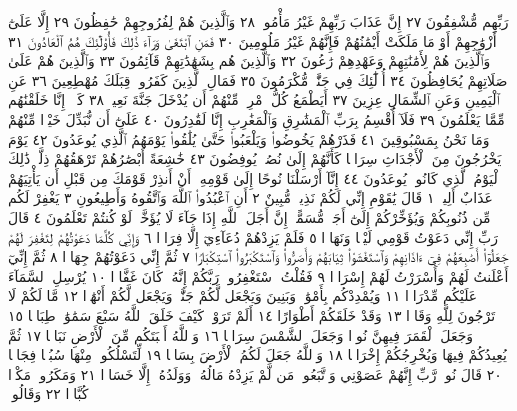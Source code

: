رَبِّهِم مُّشْفِقُونَ ٢٧ إِنَّ عَذَابَ رَبِّهِمْ غَيْرُ مَأْمُونࣲ ٢٨ وَٱلَّذِينَ هُمْ
لِفُرُوجِهِمْ حَٰفِظُونَ ٢٩ إِلَّا عَلَىٰٓ أَزْوَٰجِهِمْ أَوْ مَا مَلَكَتْ أَيْمَٰنُهُمْ فَإِنَّهُمْ
غَيْرُ مَلُومِينَ ٣٠ فَمَنِ ٱبْتَغَىٰ وَرَآءَ ذَٰلِكَ فَأُو۟لَٰٓئِكَ هُمُ ٱلْعَادُونَ ٣١ وَٱلَّذِينَ
هُمْ لِأَمَٰنَٰتِهِمْ وَعَهْدِهِمْ رَٰعُونَ ٣٢ وَٱلَّذِينَ هُم بِشَهَٰدَٰتِهِمْ قَآئِمُونَ ٣٣
وَٱلَّذِينَ هُمْ عَلَىٰ صَلَاتِهِمْ يُحَافِظُونَ ٣٤ أُو۟لَٰٓئِكَ فِي جَنَّٰتࣲ مُّكْرَمُونَ ٣٥
فَمَالِ ٱلَّذِينَ كَفَرُوا۟ قِبَلَكَ مُهْطِعِينَ ٣٦ عَنِ ٱلْيَمِينِ وَعَنِ ٱلشِّمَالِ
عِزِينَ ٣٧ أَيَطْمَعُ كُلُّ ٱمْرِئࣲ مِّنْهُمْ أَن يُدْخَلَ جَنَّةَ نَعِيمࣲ ٣٨ كَلَّآۖ إِنَّا خَلَقْنَٰهُم
مِّمَّا يَعْلَمُونَ ٣٩ فَلَآ أُقْسِمُ بِرَبِّ ٱلْمَشَٰرِقِ وَٱلْمَغَٰرِبِ إِنَّا لَقَٰدِرُونَ ٤٠
عَلَىٰٓ أَن نُّبَدِّلَ خَيْرࣰا مِّنْهُمْ وَمَا نَحْنُ بِمَسْبُوقِينَ ٤١ فَذَرْهُمْ
يَخُوضُوا۟ وَيَلْعَبُوا۟ حَتَّىٰ يُلَٰقُوا۟ يَوْمَهُمُ ٱلَّذِي يُوعَدُونَ ٤٢ يَوْمَ
يَخْرُجُونَ مِنَ ٱلْأَجْدَاثِ سِرَاعࣰا كَأَنَّهُمْ إِلَىٰ نُصُبࣲ يُوفِضُونَ ٤٣
خَٰشِعَةً أَبْصَٰرُهُمْ تَرْهَقُهُمْ ذِلَّةࣱۚ ذَٰلِكَ ٱلْيَوْمُ ٱلَّذِي كَانُوا۟ يُوعَدُونَ ٤٤
إِنَّآ أَرْسَلْنَا نُوحًا إِلَىٰ قَوْمِهِۦٓ أَنْ أَنذِرْ قَوْمَكَ مِن قَبْلِ أَن يَأْتِيَهُمْ
عَذَابٌ أَلِيمࣱ ١ قَالَ يَٰقَوْمِ إِنِّي لَكُمْ نَذِيرࣱ مُّبِينٌ ٢ أَنِ ٱعْبُدُوا۟
ٱللَّهَ وَٱتَّقُوهُ وَأَطِيعُونِ ٣ يَغْفِرْ لَكُم مِّن ذُنُوبِكُمْ وَيُؤَخِّرْكُمْ
إِلَىٰٓ أَجَلࣲ مُّسَمًّىۚ إِنَّ أَجَلَ ٱللَّهِ إِذَا جَآءَ لَا يُؤَخَّرُۚ لَوْ كُنتُمْ تَعْلَمُونَ ٤
قَالَ رَبِّ إِنِّي دَعَوْتُ قَوْمِي لَيْلࣰا وَنَهَارࣰا ٥ فَلَمْ يَزِدْهُمْ دُعَآءِيٓ إِلَّا
فِرَارࣰا ٦ وَإِنِّي كُلَّمَا دَعَوْتُهُمْ لِتَغْفِرَ لَهُمْ جَعَلُوٓا۟ أَصَٰبِعَهُمْ فِيٓ
ءَاذَانِهِمْ وَٱسْتَغْشَوْا۟ ثِيَابَهُمْ وَأَصَرُّوا۟ وَٱسْتَكْبَرُوا۟ ٱسْتِكْبَارࣰا ٧
ثُمَّ إِنِّي دَعَوْتُهُمْ جِهَارࣰا ٨ ثُمَّ إِنِّيٓ أَعْلَنتُ لَهُمْ وَأَسْرَرْتُ
لَهُمْ إِسْرَارࣰا ٩ فَقُلْتُ ٱسْتَغْفِرُوا۟ رَبَّكُمْ إِنَّهُۥ كَانَ غَفَّارࣰا ١٠
يُرْسِلِ ٱلسَّمَآءَ عَلَيْكُم مِّدْرَارࣰا ١١ وَيُمْدِدْكُم بِأَمْوَٰلࣲ وَبَنِينَ وَيَجْعَل
لَّكُمْ جَنَّٰتࣲ وَيَجْعَل لَّكُمْ أَنْهَٰرࣰا ١٢ مَّا لَكُمْ لَا تَرْجُونَ لِلَّهِ وَقَارࣰا ١٣
وَقَدْ خَلَقَكُمْ أَطْوَارًا ١٤ أَلَمْ تَرَوْا۟ كَيْفَ خَلَقَ ٱللَّهُ سَبْعَ سَمَٰوَٰتࣲ
طِبَاقࣰا ١٥ وَجَعَلَ ٱلْقَمَرَ فِيهِنَّ نُورࣰا وَجَعَلَ ٱلشَّمْسَ سِرَاجࣰا ١٦
وَٱللَّهُ أَنۢبَتَكُم مِّنَ ٱلْأَرْضِ نَبَاتࣰا ١٧ ثُمَّ يُعِيدُكُمْ فِيهَا وَيُخْرِجُكُمْ
إِخْرَاجࣰا ١٨ وَٱللَّهُ جَعَلَ لَكُمُ ٱلْأَرْضَ بِسَاطࣰا ١٩ لِّتَسْلُكُوا۟ مِنْهَا
سُبُلࣰا فِجَاجࣰا ٢٠ قَالَ نُوحࣱ رَّبِّ إِنَّهُمْ عَصَوْنِي وَٱتَّبَعُوا۟ مَن لَّمْ يَزِدْهُ
مَالُهُۥ وَوَلَدُهُۥٓ إِلَّا خَسَارࣰا ٢١ وَمَكَرُوا۟ مَكْرࣰا كُبَّارࣰا ٢٢ وَقَالُوا۟
